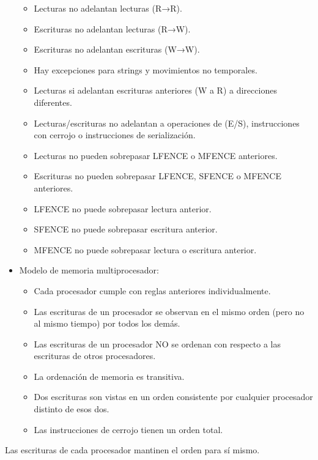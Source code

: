 \documentclass[12pt, twoside, openright]{report} %
\begin{document}
\begin{itemize}
\begin{itemize}
		      \item Lecturas no adelantan lecturas (R→R).
		      \item Escrituras no adelantan lecturas (R→W).
		      \item Escrituras no adelantan escrituras (W→W).
		      \item Hay excepciones para strings y movimientos no temporales.
		      \item Lecturas si adelantan escrituras anteriores (W a R) a
		            direcciones diferentes.
		      \item Lecturas/escrituras no adelantan a operaciones de (E/S),
		            instrucciones con cerrojo o instrucciones de serialización.
		      \item Lecturas no pueden sobrepasar LFENCE o MFENCE anteriores.
		      \item Escrituras no pueden sobrepasar LFENCE, SFENCE o MFENCE
		            anteriores.
		      \item LFENCE no puede sobrepasar lectura anterior.
		      \item SFENCE no puede sobrepasar escritura anterior.
		      \item MFENCE no puede sobrepasar lectura o escritura anterior.
	      \end{itemize}
	\item Modelo de memoria multiprocesador:

	      \begin{itemize}

		      \item Cada procesador cumple con reglas anteriores individualmente.
		      \item Las escrituras de un procesador se observan en el mismo orden
		            (pero no al mismo tiempo) por todos los demás.
		      \item Las escrituras de un procesador NO se ordenan con respecto a
		            las escrituras de otros procesadores.
		      \item La ordenación de memoria es transitiva.
		      \item Dos escrituras son vistas en un orden consistente por
		            cualquier procesador distinto de esos dos.
		      \item Las instrucciones de cerrojo tienen un orden total.
	      \end{itemize}
\end{itemize}

Las escrituras de cada procesador mantinen el orden para sí mismo.
\end{document}
